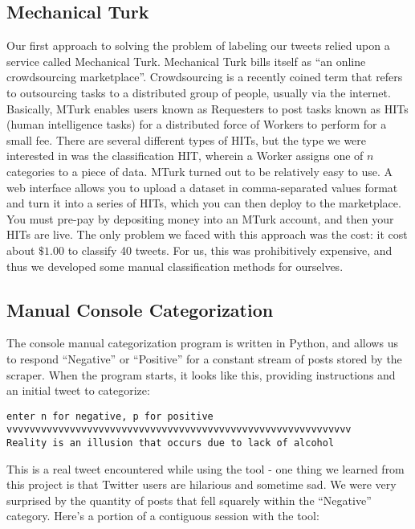 \documentclass[12pt,a4paper]{article}
\begin{document}
\subsection { Mechanical Turk }

Our first approach to solving the problem of labeling our tweets relied upon a service called Mechanical Turk. Mechanical Turk bills itself as ``an online crowdsourcing marketplace''. Crowdsourcing is a recently coined term that refers to outsourcing tasks to a distributed group of people, usually via the internet. Basically, MTurk enables users known as Requesters to post tasks known as HITs (human intelligence tasks) for a distributed force of Workers to perform for a small fee. There are several different types of HITs, but the type we were interested in was the classification HIT, wherein a Worker assigns one of $n$ categories to a piece of data. MTurk turned out to be relatively easy to use. A web interface allows you to upload a dataset in comma-separated values format and turn it into a series of HITs, which you can then deploy to the marketplace. You must pre-pay by depositing money into an MTurk account, and then your HITs are live. The only problem we faced with this approach was the cost: it cost about $\$1.00$ to classify 40 tweets. For us, this was prohibitively expensive, and thus we developed some manual classification methods for ourselves.

\subsection { Manual Console Categorization }

The console manual categorization program is written in Python, and allows us to respond ``Negative'' or ``Positive'' for a constant stream of posts stored by the scraper.  When the program starts, it looks like this, providing instructions and an initial tweet to categorize:

\begin{verbatim}
enter n for negative, p for positive
vvvvvvvvvvvvvvvvvvvvvvvvvvvvvvvvvvvvvvvvvvvvvvvvvvvvvvvvvvvv
Reality is an illusion that occurs due to lack of alcohol
\end{verbatim}

This is a real tweet encountered while using the tool - one thing we learned from this project is that Twitter users are hilarious and sometime sad.  We were very surprised by the quantity of posts that fell squarely within the ``Negative'' category.  Here's a portion of a contiguous session with the tool:
\end{document}
